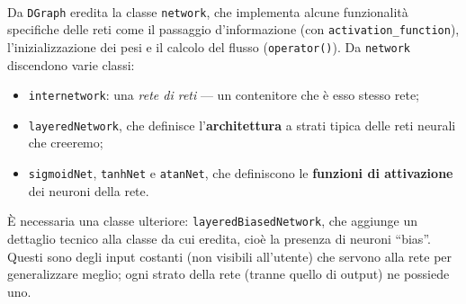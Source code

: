 \documentclass{article}
\begin{document}
\begin{center}
\end{center}

\paragraph{} Da \texttt{DGraph} eredita la classe \texttt{network}, che implementa alcune funzionalità specifiche delle reti come il passaggio d'informazione (con \texttt{activation\_function}), l'inizializzazione dei pesi e il calcolo del flusso (\texttt{operator()}). Da \texttt{network} discendono varie classi:
\begin{itemize}
	\item \texttt{internetwork}: una \emph{rete di reti} --- un contenitore che è esso stesso rete;
	\item \texttt{layeredNetwork}, che definisce l'\textbf{architettura} a strati tipica delle reti neurali che creeremo;
	\item \texttt{sigmoidNet}, \texttt{tanhNet} e \texttt{atanNet}, che definiscono le \textbf{funzioni di attivazione} dei neuroni della rete.
\end{itemize}
È necessaria una classe ulteriore: \texttt{layeredBiasedNetwork}, che aggiunge un dettaglio tecnico alla classe da cui eredita, cioè la presenza di neuroni “bias”. Questi sono degli input costanti (non visibili all'utente) che servono alla rete per generalizzare meglio; ogni strato della rete (tranne quello di output) ne possiede uno.
\end{document}
